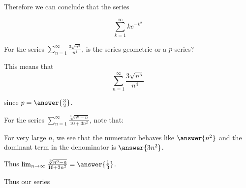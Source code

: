 \documentclass{ximera}
\begin{document}
\begin{exercise}
\begin{hint}
\begin{question}
Therefore we can conclude that the series 

\[
 \sum_{k=1}^{\infty}ke^{-k^2}
\]

\begin{multipleChoice}
\end{multipleChoice}




\end{question}



\begin{question}
For the series $\sum_{n=1}^{\infty} \frac{3\sqrt{n^5}}{n^4}$, is the series geometric or a $p$-series?

\begin{multipleChoice}
\end{multipleChoice}


This means that 
\[
 \sum_{n=1}^{\infty} \frac{3\sqrt{n^5}}{n^4}
\]

\begin{multipleChoice}
\end{multipleChoice}

since $p=\answer{ \frac{3}{2}}$. 


\end{question}

\begin{question}
For the series $\sum_{n=1}^{\infty}\frac{\sqrt[3]{n^6-n}}{10+3n^2}$, note that:

\begin{multipleChoice}
\end{multipleChoice}

For very large $n$, we see that the numerator behaves like $\answer{n^2}$ and the dominant term in the denominator 
is $\answer{3n^2}$. 

Thus $\lim_{n \to \infty} \frac{\sqrt[3]{n^6-n}}{10+3n^2}=\answer{ \frac{1}{3}}$. 



Thus our series


\end{question}
\end{hint}
\end{exercise}
\end{document}
